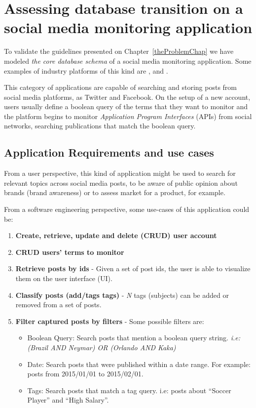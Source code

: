 \section{Assessing database transition on a social media monitoring application}
\label{socmediamonitoringapp}

To validate the guidelines presented on Chapter~\ref{theProblemChap} we have modeled \textit{the core database schema} of a social media monitoring  application. Some examples of industry platforms of this kind are \cite{sproutsocial}, \cite{mention} and \cite{buzzmonitor}. 

This category of applications are capable of searching and storing posts from social media platforms, as Twitter and Facebook. On the setup of a new account, users usually define a boolean query of the terms that they want to monitor and the platform begins to monitor \textit{Application Program Interfaces} (APIs) from social networks, searching publications that match the boolean query. 

\subsection{Application Requirements and use cases}
\label{appoperations}
From a user perspective, this kind of application might be used to search for relevant topics across social media posts, to be aware of public opinion about brands (brand awareness) or to assess market for a product, for example. 

From a software engineering perspective, some use-cases of this application could be:

\begin{enumerate}
\item{\textbf{Create, retrieve, update and delete (CRUD) user account}}
\item{\textbf{CRUD users' terms to monitor}}

\clearpage
\item{\textbf{Retrieve posts by ids} - Given a set of post ids, the user is able to visualize them on the user interface (UI).}

\item{\textbf{Classify posts (add/tags tags)} - \textit{N} tags (subjects) can be added or removed from a set of posts.}

\item{\textbf{Filter captured posts by filters} - Some possible filters are: 
\begin{itemize}
\item{Boolean Query:} Search posts that mention a boolean query string. \textit{i.e: (Brazil AND Neymar) OR (Orlando AND Kaka)}
\item{Date:} Search posts that were published within a date range. For example: posts from 2015/01/01 to 2015/02/01.
\item{Tags:} Search posts that match a tag query. i.e: posts about ``Soccer Player'' and ``High Salary''.
\end{itemize}
}

\end{enumerate}

